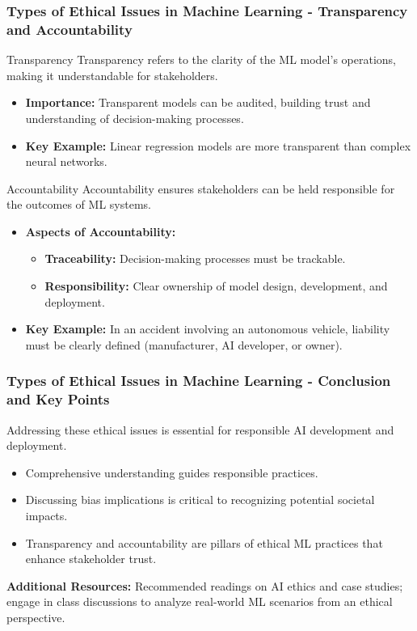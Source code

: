 \documentclass[aspectratio=169]{beamer}
\begin{document}
\begin{frame}[fragile]
    \frametitle{Types of Ethical Issues in Machine Learning - Transparency and Accountability}
    \begin{block}{Transparency}
        Transparency refers to the clarity of the ML model's operations, making it understandable for stakeholders.
    \end{block}
    
    \begin{itemize}
        \item \textbf{Importance:} Transparent models can be audited, building trust and understanding of decision-making processes.
        \item \textbf{Key Example:} Linear regression models are more transparent than complex neural networks.
    \end{itemize}
    
    \bigskip
    
    \begin{block}{Accountability}
        Accountability ensures stakeholders can be held responsible for the outcomes of ML systems.
    \end{block}
    
    \begin{itemize}
        \item \textbf{Aspects of Accountability:}
        \begin{itemize}
            \item \textbf{Traceability:} Decision-making processes must be trackable.
            \item \textbf{Responsibility:} Clear ownership of model design, development, and deployment.
        \end{itemize}
        \item \textbf{Key Example:} In an accident involving an autonomous vehicle, liability must be clearly defined (manufacturer, AI developer, or owner).
    \end{itemize}
\end{frame}

\begin{frame}[fragile]
    \frametitle{Types of Ethical Issues in Machine Learning - Conclusion and Key Points}
    Addressing these ethical issues is essential for responsible AI development and deployment. 
    \begin{itemize}
        \item Comprehensive understanding guides responsible practices.
        \item Discussing bias implications is critical to recognizing potential societal impacts.
        \item Transparency and accountability are pillars of ethical ML practices that enhance stakeholder trust.
    \end{itemize}
    
    \bigskip
    \textbf{Additional Resources:} Recommended readings on AI ethics and case studies; engage in class discussions to analyze real-world ML scenarios from an ethical perspective.
\end{frame}
\end{document}
